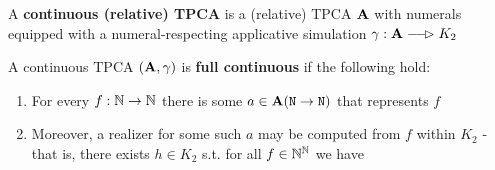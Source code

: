 \documentclass[11pt]{article}
\begin{document}
\begin{definition}[]
A \textbf{continuous (relative) TPCA} is a (relative) TPCA \(\operatorname{\textbf{A}}\) with numerals equipped with a
numeral-respecting applicative simulation \(\gamma:\bA\lrarhd K_2\)
\end{definition}

\begin{definition}[]
A continuous TPCA \((\operatorname{\textbf{A}},\gamma)\) is \textbf{full continuous} if the following hold:
\begin{enumerate}
\item For every \(f:\mathbb{N}\to\mathbb{N}\) there is some \(a\in\operatorname{\textbf{A}}(\texttt{N}\to\texttt{N})\) that represents \(f\)
\item Moreover, a realizer for some such \(a\) may be computed from \(f\) within \(K_2\) - that is,
there exists \(h\in K_2\) s.t. for all \(f\in\mathbb{N}^{\mathbb{N}}\) we have
\end{enumerate}
\end{definition}
\end{document}
